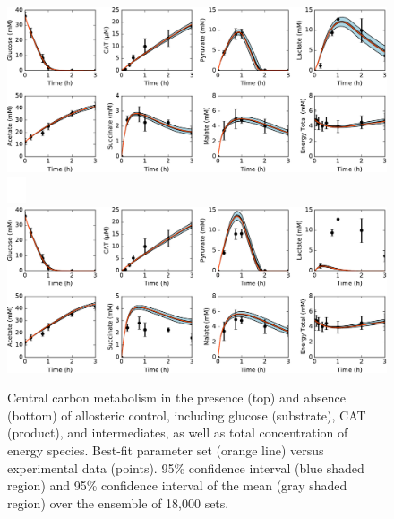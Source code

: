 \documentclass[12pt]{article}
\begin{document}
\begin{figure}[ht]
\centering
\includegraphics[width=1.00\textwidth]{./Figures/Carbon.pdf}
\includegraphics[width=0.05\textwidth]{./Figures/null.pdf}
\includegraphics[width=1.00\textwidth]{./Figures/CarbonNoControl.pdf}
\caption{Central carbon metabolism in the presence (top) and absence (bottom) of allosteric control, including glucose (substrate), CAT (product), and intermediates, as well as total concentration of energy species. Best-fit parameter set (orange line) versus experimental data (points). 95\% confidence interval (blue shaded region) and 95\% confidence interval of the mean (gray shaded region) over the ensemble of 18,000 sets.}
\label{fig:BothCarbon}
\end{figure}
\end{document}
